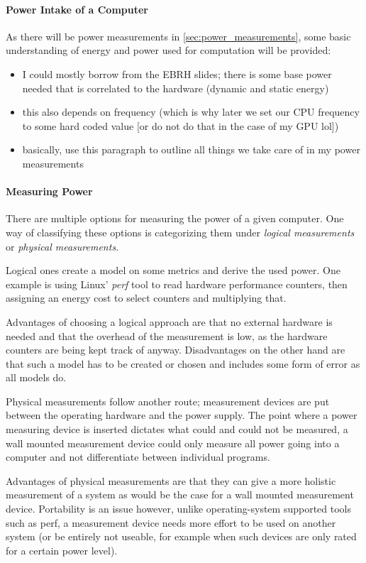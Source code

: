 \paragraph{Power Intake of a Computer}
As there will be power measurements in \ref{sec:power_measurements}, some basic understanding of energy and power used for computation will be provided:
\begin{itemize}
    \item I could mostly borrow from the EBRH slides; there is some base power needed that is correlated to the hardware (dynamic and static energy)
    \item this also depends on frequency (which is why later we set our CPU frequency to some hard coded value [or do not do that in the case of my GPU lol])
    \item basically, use this paragraph to outline all things we take care of in my power measurements
\end{itemize}

\paragraph{Measuring Power}

There are multiple options for measuring the power of a given computer. One way of classifying these options is categorizing them under \emph{logical measurements} or \emph{physical measurements}.

Logical ones create a model on some metrics and derive the used power. One example is using Linux' \emph{perf} tool to read hardware performance counters, then assigning an energy cost to select counters and multiplying that. 

Advantages of choosing a logical approach are that no external hardware is needed and that the overhead of the measurement is low, as the hardware counters are being kept track of anyway. 
Disadvantages on the other hand are that such a model has to be created or chosen and includes some form of error as all models do.

Physical measurements follow another route; measurement devices are put between the operating hardware and the power supply. 
The point where a power measuring device is inserted dictates what could and could not be measured, a wall mounted measurement device could only measure all power going into a computer and not differentiate between individual programs.

Advantages of physical measurements are that they can give a more holistic measurement of a system as would be the case for a wall mounted measurement device. 
Portability is an issue however, unlike operating-system supported tools such as perf, a measurement device needs more effort to be used on another system (or be entirely not useable, for example when such devices are only rated for a certain power level).
